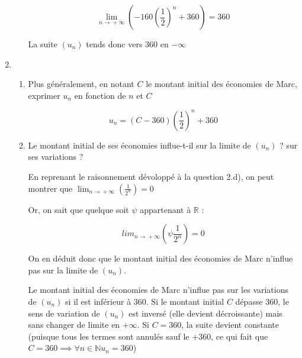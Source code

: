 \documentclass[10pt]{scrartcl}
\begin{document}
\begin{enumerate}[label=\textbf{\arabic*{}.}]
\begin{enumerate}[label=\textbf{\alph*)}]
        \[
            \lim_{n\rightarrow{} +\infty{}}\left(-160\left(\frac{1}{2}\right)^n+360\right) = 360
        \]

        La suite $(u_n)$ tends donc vers $360$ en $-\infty{}$
    \end{enumerate}

    \item \begin{enumerate}[label=\textbf{\alph*{})}]
        \item  Plus généralement, en notant $C$ le montant initial des économies de Marc, exprimer $u_n$ en fonction de $n$ et $C$

        \[
            u_n = (C - 360)\left(\frac{1}{2}\right)^n + 360
        \]

        \item Le montant initial de ses économies influe-t-il sur la limite de $(u_n)$ ? sur ses variations ?

        En reprenant le raisonnement dévoloppé à la question 2.d), on peut montrer que $\displaystyle{}\lim_{n\rightarrow{}+\infty{}}\left(\frac{1}{2^n}\right) = 0$

        Or, on sait que quelque soit $\psi$ appartenant à $\mathbb{R}$ :

        \[
            \displaystyle{}lim_{n\rightarrow{}+\infty{}}\left(\psi\frac{1}{2^n}\right) = 0
        \]

        On en déduit donc que le montant initial des économies de Marc n'influe pas sur la limite de $(u_n)$.

        Le montant initial des économies de Marc n'influe pas sur les variations de $(u_n)$ si il est inférieur à 360. Si le montant initial $C$ dépasse 360, le sens de variation de $(u_n)$ est inversé (elle devient décroissante) mais sans changer de limite en $+\infty{}$. Si $C = 360$, la suite devient constante (puisque tous les termes sont annulés sauf le $+360$, ce qui fait que $C=360 \implies{} \forall n \in \mathbb{N}u_n = 360$)

    \end{enumerate}
\end{enumerate}







\newpage{}%
\Exercice{}%
\end{document}
